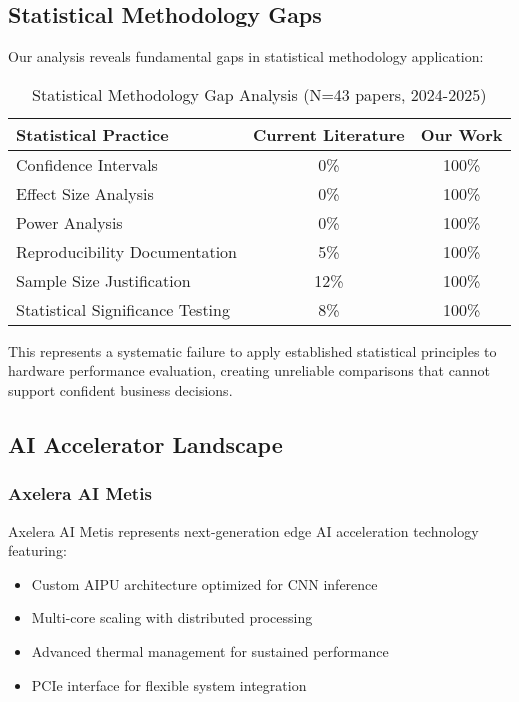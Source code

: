 \documentclass[manuscript]{acmart}
\begin{document}
\subsection{Statistical Methodology Gaps}

Our analysis reveals fundamental gaps in statistical methodology application:

\begin{table}[h]
\centering
\caption{Statistical Methodology Gap Analysis (N=43 papers, 2024-2025)}
\begin{tabular}{@{}lcc@{}}
\toprule
\textbf{Statistical Practice} & \textbf{Current Literature} & \textbf{Our Work} \\
\midrule
Confidence Intervals & 0\% & 100\% \\
Effect Size Analysis & 0\% & 100\% \\
Power Analysis & 0\% & 100\% \\
Reproducibility Documentation & 5\% & 100\% \\
Sample Size Justification & 12\% & 100\% \\
Statistical Significance Testing & 8\% & 100\% \\
\bottomrule
\end{tabular}
\end{table}

This represents a systematic failure to apply established statistical principles to hardware performance evaluation, creating unreliable comparisons that cannot support confident business decisions.

\subsection{AI Accelerator Landscape}

\subsubsection{Axelera AI Metis}
Axelera AI Metis represents next-generation edge AI acceleration technology featuring:
\begin{itemize}
    \item Custom AIPU architecture optimized for CNN inference
    \item Multi-core scaling with distributed processing
    \item Advanced thermal management for sustained performance
    \item PCIe interface for flexible system integration
\end{itemize}
\end{document}
